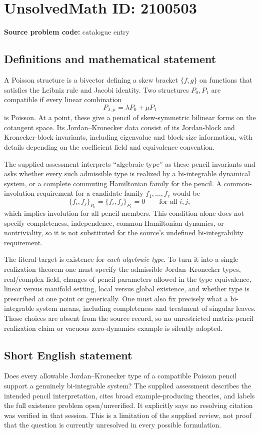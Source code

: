\documentclass[11pt]{article}
\begin{document}
\section*{UnsolvedMath ID: 2100503}
\textbf{Source problem code:} catalogue entry
\subsection{Definitions and mathematical statement}
A Poisson structure is a bivector defining a skew bracket $\{f,g\}$ on functions that satisfies the Leibniz rule and Jacobi identity. Two structures $P_0,P_1$ are compatible if every linear combination
\[
 P_{\lambda,\mu}=\lambda P_0+\mu P_1
\]
is Poisson. At a point, these give a pencil of skew-symmetric bilinear forms on the cotangent space. Its Jordan--Kronecker data consist of its Jordan-block and Kronecker-block invariants, including eigenvalue and block-size information, with details depending on the coefficient field and equivalence convention.

The supplied assessment interprets ``algebraic type'' as these pencil invariants and asks whether every such admissible type is realized by a bi-integrable dynamical system, or a complete commuting Hamiltonian family for the pencil. A common-involution requirement for a candidate family $f_1,\ldots,f_r$ would be
\[
 \{f_i,f_j\}_{P_0}=\{f_i,f_j\}_{P_1}=0\qquad\text{for all }i,j,
\]
which implies involution for all pencil members. This condition alone does not specify completeness, independence, common Hamiltonian dynamics, or nontriviality, so it is not substituted for the source's undefined bi-integrability requirement.

The literal target is existence for \emph{each algebraic type}. To turn it into a single realization theorem one must specify the admissible Jordan--Kronecker types, real/complex field, changes of pencil parameters allowed in the type equivalence, linear versus manifold setting, local versus global existence, and whether type is prescribed at one point or generically. One must also fix precisely what a bi-integrable system means, including completeness and treatment of singular leaves. Those choices are absent from the source record, so no unrestricted matrix-pencil realization claim or vacuous zero-dynamics example is silently adopted.
\subsection{Short English statement}
Does every allowable Jordan--Kronecker type of a compatible Poisson pencil support a genuinely bi-integrable system? The supplied assessment describes the intended pencil interpretation, cites broad example-producing theories, and labels the full existence problem open/unverified. It explicitly says no resolving citation was verified in that session. This is a limitation of the supplied review, not proof that the question is currently unresolved in every possible formulation.
\end{document}
